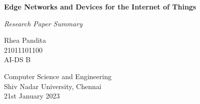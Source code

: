 \begin{titlepage}
    \centering
        \vspace*{2cm}
        \Huge
        \textbf{Edge Networks and Devices for the Internet of Things}
        
        \vspace*{0.6cm}
        \Large
        \textit{Research Paper Summary}
        
        \normalsize
        \vspace*{1.5cm}
        Rhea Pandita\\
        \vspace{0.2cm}
        21011101100\\
        \vspace{0.2cm}
        AI-DS B\\
        
        \vfill
        
        
        
       
        
        \vfill
        
        
       
        Computer Science and Engineering\\
        Shiv Nadar University, Chennai\\
        21st January 2023
        \vspace*{1cm}
    
\end{titlepage}

